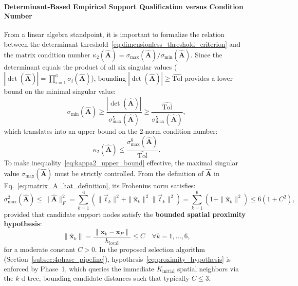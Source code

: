 \documentclass[preprint,12pt]{elsarticle}
\begin{document}
\paragraph{Determinant-Based Empirical Support Qualification versus Condition Number}
From a linear algebra standpoint, it is important to formalize the relation between the determinant threshold~\eqref{eq:dimensionless_threshold_criterion} and the matrix condition number $\kappa_2(\widehat{\mathbf{A}}) = \sigma_{\max}(\widehat{\mathbf{A}}) / \sigma_{\min}(\widehat{\mathbf{A}})$. Since the determinant equals the product of all six singular values ($|\det(\widehat{\mathbf{A}})| = \prod_{i=1}^6 \sigma_i(\widehat{\mathbf{A}})$), bounding $|\det(\widehat{\mathbf{A}})| \ge \widehat{\mathrm{Tol}}$ provides a lower bound on the minimal singular value:
\begin{equation}
\sigma_{\min}(\widehat{\mathbf{A}}) \ge \frac{|\det(\widehat{\mathbf{A}})|}{\sigma_{\max}^5(\widehat{\mathbf{A}})} \ge \frac{\widehat{\mathrm{Tol}}}{\sigma_{\max}^5(\widehat{\mathbf{A}})},
\label{eq:sigma_min_bound}
\end{equation}
which translates into an upper bound on the 2-norm condition number:
\begin{equation}
\kappa_2(\widehat{\mathbf{A}}) \le \frac{\sigma_{\max}^6(\widehat{\mathbf{A}})}{\widehat{\mathrm{Tol}}}.
\label{eq:kappa2_upper_bound}
\end{equation}
To make inequality~\eqref{eq:kappa2_upper_bound} effective, the maximal singular value $\sigma_{\max}(\widehat{\mathbf{A}})$ must be strictly controlled. From the definition of $\widehat{\mathbf{A}}$ in Eq.~\eqref{eq:matrix_A_hat_definition}, its Frobenius norm satisfies:
\begin{equation}
\sigma_{\max}^2(\widehat{\mathbf{A}}) \le \|\widehat{\mathbf{A}}\|_F^2 = \sum_{k=1}^6 \left( \|\vec{t}_k\|^2 + \|\hat{\mathbf{x}}_k\|^2 \|\vec{t}_k\|^2 \right) = \sum_{k=1}^6 \left( 1 + \|\hat{\mathbf{x}}_k\|^2 \right) \le 6(1 + C^2),
\label{eq:frobenius_bound}
\end{equation}
provided that candidate support nodes satisfy the \textbf{bounded spatial proximity hypothesis}:
\begin{equation}
\|\hat{\mathbf{x}}_k\| = \frac{\|\mathbf{x}_k - \mathbf{x}_P\|}{h_{\mathrm{local}}} \le C \quad \forall k=1,\dots,6,
\label{eq:proximity_hypothesis}
\end{equation}
for a moderate constant $C > 0$. In the proposed selection algorithm (Section~\ref{subsec:4phase_pipeline}), hypothesis~\eqref{eq:proximity_hypothesis} is enforced by Phase~1, which queries the immediate $K_{\mathrm{initial}}$ spatial neighbors via the $k$-d tree, bounding candidate distances such that typically $C \le 3$.
\end{document}
